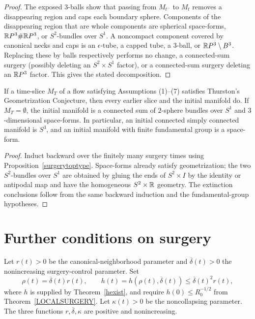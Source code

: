 \begin{proof}
\sketch
{}
The exposed $3$-balls show that passing from $M_{t^-}$ to $M_t$ removes a
disappearing region and caps each boundary sphere. Components of the disappearing
region that are whole components are spherical space-forms,
$\mathbb{R} P^3\#\mathbb{R} P^3$, or $S^2$-bundles over $S^1$. A noncompact component covered
by canonical necks and caps is an $\epsilon$-tube, a capped tube, a $3$-ball,
or $\mathbb{R} P^3\setminus B^3$. Replacing these by balls respectively performs no
change, a connected-sum surgery (possibly deleting an $S^2\times S^1$ factor),
or a connected-sum surgery deleting an $\mathbb{R} P^3$ factor. This gives the stated
decomposition.
\end{proof}

\begin{corollary}
\label{cor:geometrization-inherited-across-surgery}

\label{Tgood0good}
If a time-slice $M_T$ of a flow satisfying Assumptions (1)--(7) satisfies
Thurston's Geometrization Conjecture, then every earlier slice and the initial
manifold do. If $M_T=\emptyset$, the initial manifold is a connected sum of
$2$-sphere bundles over $S^1$ and $3$-dimensional space-forms. In particular,
an initial connected simply connected manifold is $S^3$, and an initial
manifold with finite fundamental group is a space-form.
\end{corollary}

\begin{proof}
\sketch
Induct backward over the finitely many surgery times using
Proposition~\ref{surgerytoptype}. Space-forms already satisfy geometrization;
the two $S^2$-bundles over $S^1$ are obtained by gluing the ends of
$S^2\times I$ by the identity or antipodal map and have the homogeneous
$S^2\times\mathbb{R}$ geometry. The extinction conclusions follow from the same
backward induction and the fundamental-group hypotheses.
\end{proof}

\section{Further conditions on surgery}

\begin{definition}
\label{def:surgery-scale-function}

\label{hrestricted}
Let $r(t)>0$ be the canonical-neighborhood parameter and
$\overline\delta(t)>0$ the nonincreasing surgery-control parameter. Set
\[
  \rho(t)=\overline\delta(t)r(t),
  \qquad
  h(t)=h(\rho(t),\overline\delta(t))
  \leq\overline\delta(t)^2r(t),
\]
where $h$ is supplied by Theorem~\ref{hexist}, and require
$h(0)\leq R_0^{-1/2}$ from Theorem~\ref{LOCALSURGERY}. Let
$\kappa(t)>0$ be the noncollapsing parameter. The three functions
$r,\overline\delta,\kappa$ are positive and nonincreasing.
\end{definition}

